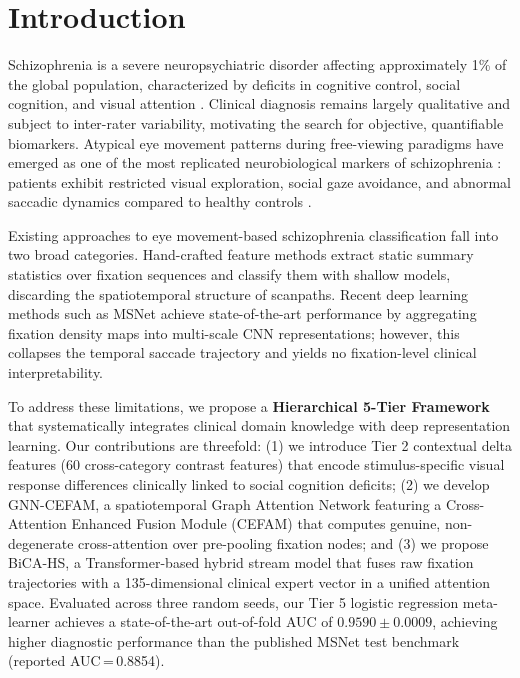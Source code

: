 \section{Introduction}
\label{sec:introduction}

Schizophrenia is a severe neuropsychiatric disorder affecting approximately 1\% of the global population, characterized by deficits in cognitive control, social cognition, and visual attention \cite{holzman1973}. Clinical diagnosis remains largely qualitative and subject to inter-rater variability, motivating the search for objective, quantifiable biomarkers. Atypical eye movement patterns during free-viewing paradigms have emerged as one of the most replicated neurobiological markers of schizophrenia \cite{benson2012}: patients exhibit restricted visual exploration, social gaze avoidance, and abnormal saccadic dynamics compared to healthy controls \cite{morita2020}.

Existing approaches to eye movement-based schizophrenia classification fall into two broad categories. Hand-crafted feature methods \cite{shpigelman2008, huang2020, tseng2013} extract static summary statistics over fixation sequences and classify them with shallow models, discarding the spatiotemporal structure of scanpaths. Recent deep learning methods such as MSNet \cite{song2025} achieve state-of-the-art performance by aggregating fixation density maps into multi-scale CNN representations; however, this collapses the temporal saccade trajectory and yields no fixation-level clinical interpretability.

To address these limitations, we propose a \textbf{Hierarchical 5-Tier Framework} that systematically integrates clinical domain knowledge with deep representation learning. Our contributions are threefold: 
(1) we introduce Tier 2 contextual delta features (60 cross-category contrast features) that encode stimulus-specific visual response differences clinically linked to social cognition deficits; 
(2) we develop GNN-CEFAM, a spatiotemporal Graph Attention Network featuring a Cross-Attention Enhanced Fusion Module (CEFAM) that computes genuine, non-degenerate cross-attention over pre-pooling fixation nodes; and 
(3) we propose BiCA-HS, a Transformer-based hybrid stream model that fuses raw fixation trajectories with a 135-dimensional clinical expert vector in a unified attention space. Evaluated across three random seeds, our Tier 5 logistic regression meta-learner achieves a state-of-the-art out-of-fold AUC of $0.9590 \pm 0.0009$, achieving higher diagnostic performance than the published MSNet test benchmark (reported AUC\,=\,0.8854).
